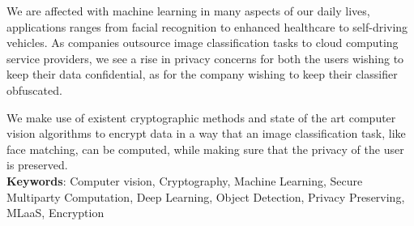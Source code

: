 We are affected with machine learning in many aspects of our daily lives, applications ranges from facial recognition to enhanced healthcare to self-driving vehicles. As companies outsource image classification tasks to cloud computing service providers, we see a rise in privacy concerns for both the users wishing to keep their data confidential, as for the company wishing to keep their classifier obfuscated.

We make use of existent cryptographic methods and state of the art computer vision algorithms to encrypt data in a way that an image classification task, like face matching, can be computed, while making sure that the privacy of the user is preserved.\\

\textbf{Keywords}: Computer vision, Cryptography, Machine Learning, Secure Multiparty Computation, Deep Learning, Object Detection, Privacy Preserving, MLaaS, Encryption
